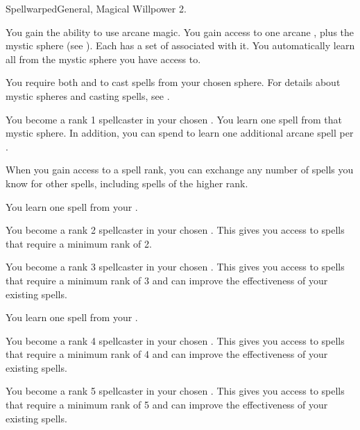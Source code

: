   \begin{magicalfeat}{Spellwarped}{General, Magical}
    \featpre Willpower 2.

     You gain the ability to use arcane magic.
    You gain access to one arcane , plus the  mystic sphere (see ).
    Each  has a set of  associated with it.
    You automatically learn all  from the mystic sphere you have access to.

    You require both  and  to cast spells from your chosen sphere.
    For details about mystic spheres and casting spells, see .

     You become a rank 1 spellcaster in your chosen .
    You learn one spell from that mystic sphere.
    In addition, you can spend  to learn one additional arcane spell per .

    When you gain access to a spell rank,
    you can exchange any number of spells you know for other spells,
    including spells of the higher rank.

     You learn one spell from your .

     You become a rank 2 spellcaster in your chosen .
    This gives you access to spells that require a minimum rank of 2.

     You become a rank 3 spellcaster in your chosen .
    This gives you access to spells that require a minimum rank of 3 and can improve the effectiveness of your existing spells.

     You learn one spell from your .

     You become a rank 4 spellcaster in your chosen .
    This gives you access to spells that require a minimum rank of 4 and can improve the effectiveness of your existing spells.

     You become a rank 5 spellcaster in your chosen .
    This gives you access to spells that require a minimum rank of 5 and can improve the effectiveness of your existing spells.


\end{magicalfeat}
